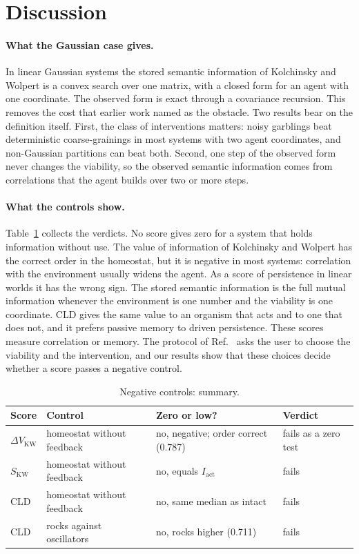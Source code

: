 \documentclass[11pt]{article}
\newcommand{\Iact}{I_{\mathrm{act}}}
\newcommand{\DVKW}{\Delta V_{\mathrm{KW}}}
\newcommand{\SKW}{S_{\mathrm{KW}}}
\begin{document}
\section{Discussion}
\label{sec:discussion}

\paragraph{What the Gaussian case gives.} In linear Gaussian systems the stored semantic information of Kolchinsky and
Wolpert is a convex search over one matrix, with a closed form for an agent with one coordinate. The observed form is
exact through a covariance recursion. This removes the cost that earlier work named as the obstacle. Two results bear
on the definition itself. First, the class of interventions matters: noisy garblings beat deterministic
coarse-grainings in most systems with two agent coordinates, and non-Gaussian partitions can beat both. Second, one
step of the observed form never changes the viability, so the observed semantic information comes from correlations
that the agent builds over two or more steps.

\paragraph{What the controls show.} Table~\ref{tab:summary} collects the verdicts. No score gives zero for a system that
holds information without use. The value of information of Kolchinsky and Wolpert has the correct order in the
homeostat, but it is negative in most systems: correlation with the environment usually widens the agent. As a score of
persistence in linear worlds it has the wrong sign. The stored semantic information is the full mutual information
whenever the environment is one number and the viability is one coordinate. CLD gives the same value to an organism
that acts and to one that does not, and it prefers passive memory to driven persistence. These scores measure
correlation or memory. The protocol of Ref.~\cite{SowinskiFrankGhoshal24} asks the user to choose the viability and the
intervention, and our results show that these choices decide whether a score passes a negative control.

\begin{table}[t]
\centering
\caption{Negative controls: summary.}
\label{tab:summary}
\begin{tabular}{llll}
\toprule
Score & Control & Zero or low? & Verdict \\
\midrule
$\DVKW$ & homeostat without feedback & no, negative; order correct (0.787) & fails as a zero test \\
$\SKW$ & homeostat without feedback & no, equals $\Iact$ & fails \\
CLD & homeostat without feedback & no, same median as intact & fails \\
CLD & rocks against oscillators & no, rocks higher (0.711) & fails \\
\bottomrule
\end{tabular}
\end{table}
\end{document}
